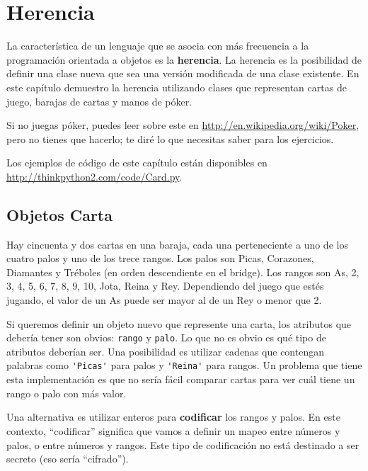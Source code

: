 \documentclass[10pt]{book}
\begin{document}
\chapter{Herencia}

La característica de un lenguaje que se asocia con más frecuencia a la programación
orientada a objetos es la {\bf herencia}.  La herencia es la posibilidad de
definir una clase nueva que sea una versión modificada de una clase existente.
En este capítulo demuestro la herencia utilizando clases que representan
cartas de juego, barajas de cartas y manos de póker.

Si no juegas
póker, puedes leer sobre este en
\url{http://en.wikipedia.org/wiki/Poker}, pero no tienes que hacerlo; 
te diré lo que necesitas saber para los ejercicios.

Los ejemplos de código de
este capítulo están disponibles en
\url{http://thinkpython2.com/code/Card.py}.


\section{Objetos Carta}

Hay cincuenta y dos cartas en una baraja, cada una perteneciente a uno de
los cuatro palos y uno de los trece rangos.  Los palos son Picas, Corazones,
Diamantes y Tréboles (en orden descendiente en el bridge).  Los rangos son
As, 2, 3, 4, 5, 6, 7, 8, 9, 10, Jota, Reina y Rey.  Dependiendo del
juego que estés jugando, el valor de un As puede ser mayor al de un Rey
o menor que 2.

Si queremos definir un objeto nuevo que represente una carta, los
atributos que debería tener son obvios: {\tt rango} y
{\tt palo}.  Lo que no es obvio es qué tipo de atributos
deberían ser.  Una posibilidad es utilizar cadenas que contengan palabras como
\verb"'Picas'" para palos y \verb"'Reina'" para rangos.  Un problema que
tiene esta implementación es que no sería fácil comparar cartas para
ver cuál tiene un rango o palo con más valor.

Una alternativa es utilizar enteros para {\bf codificar} los rangos y palos.
En este contexto, ``codificar'' significa que vamos a definir un mapeo
entre números y palos, o entre números y rangos.  Este
tipo de codificación no está destinado a ser secreto (eso
sería ``cifrado'').

\newcommand{\mymapsto}{$\mapsto$}
\end{document}
